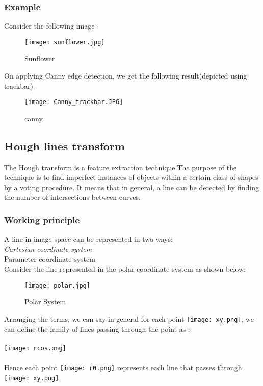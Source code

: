 \documentclass[]{article}
\begin{document}
\subsubsection{Example}\label{example}

Consider the following image-

\begin{figure}[htbp]
\centering
\texttt{[image: sunflower.jpg]}
\caption{Sunflower}
\end{figure}

On applying Canny edge detection, we get the following result(depicted
using trackbar)-

\begin{figure}[htbp]
\centering
\texttt{[image: Canny\_trackbar.JPG]}
\caption{canny}
\end{figure}

\subsection{Hough lines transform}\label{hough-lines-transform}

The Hough transform is a feature extraction technique.The purpose of the
technique is to find imperfect instances of objects within a certain
class of shapes by a voting procedure. It means that in general, a line
can be detected by finding the number of intersections between curves.

\subsubsection{Working principle}\label{working-principle}

A line in image space can be represented in two ways:\\
\emph{Cartesian coordinate system\\
}Parameter coordinate system\\
Consider the line represented in the polar coordinate system as shown
below:\\
\begin{figure}
\texttt{[image: polar.jpg]}
\caption{Polar System}
\end{figure}
Arranging the terms, we can say in general for each point
\texttt{[image: xy.png]}, we can
define the family of lines passing through the point as :\\ \\
\texttt{[image: rcos.png]} \\ \\ Hence each
point \texttt{[image: r0.png]}
represents each line that passes through
\texttt{[image: xy.png]}.
\end{document}
